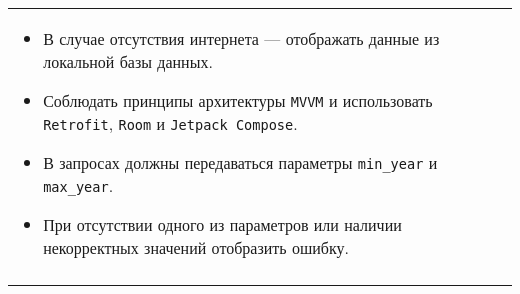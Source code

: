 \documentclass[a4paper]{article}
\begin{document}
\begin{tabular}{!{\vrule width 2pt}p{5cm}|p{6cm}|p{4cm}!{\vrule width 2pt}}
{\begin{minipage}{16cm}
\begin{enumerate}
\begin{itemize}
  \item В случае отсутствия интернета — отображать данные из локальной базы данных.
  \item Соблюдать принципы архитектуры \texttt{MVVM} и использовать \texttt{Retrofit}, \texttt{Room} и \texttt{Jetpack Compose}.
  \item В запросах должны передаваться параметры \texttt{min\_year} и \texttt{max\_year}.
  \item При отсутствии одного из параметров или наличии некорректных значений отобразить ошибку.
\end{itemize} 
\end{enumerate}

\vspace{0.2cm}
    
\end{minipage}
}
\\
\end{tabular}

\newpage
\end{document}
